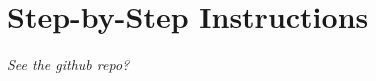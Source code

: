 \documentclass{article}
\begin{document}
\section{Step-by-Step Instructions}
\textit{See the github repo?}



\end{document}
